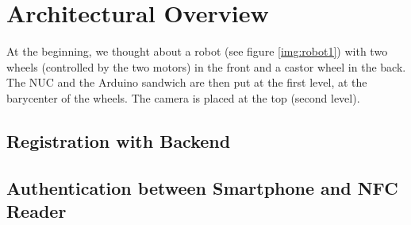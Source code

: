 \section{Architectural Overview}\label{sec:arch}
At the beginning, we thought about a robot (see figure \ref{img:robot1}) with two wheels (controlled by the two motors) in the front and a castor wheel in the back. The NUC and the Arduino sandwich are then put at the first level, at the barycenter of the wheels. The camera is placed at the top (second level).

\subsection{Registration with Backend}

\subsection{Authentication between Smartphone and NFC Reader}